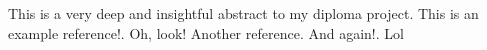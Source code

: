 \documentclass[../main.tex]{subfiles}
\begin{document}
This is a very deep and insightful abstract to my diploma project. This is an example reference!\autocite{monaghan1992}. Oh, look!\autocite{monaghan1992} Another reference\autocite{gustafsson2020}. And again!\autocite{monaghan1992}. Lol\autocite{gustafsson2020}
\end{document}
